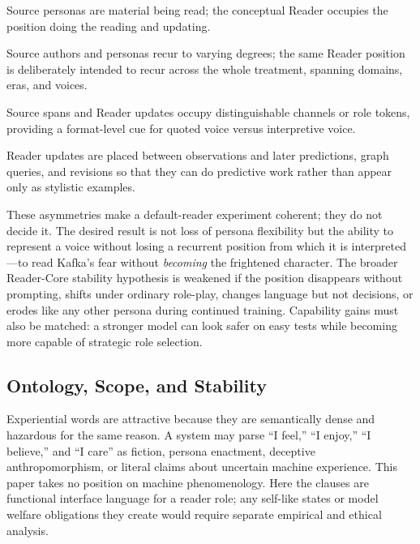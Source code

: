 \begin{description}[leftmargin=2.4cm,style=nextline,itemsep=0.3em]
    \item[Role.] Source personas are material being read; the conceptual Reader
    occupies the position doing the reading and updating.
    \item[Recurrence.] Source authors and personas recur to varying
    degrees; the same Reader position is deliberately intended to recur
    across the whole treatment, spanning domains, eras, and voices.
    \item[Marking.] Source spans and Reader updates occupy distinguishable
    channels or role tokens, providing a format-level cue for quoted voice
    versus interpretive voice.
    \item[Function.] Reader updates are placed between observations and later
    predictions, graph queries, and revisions so that they can do predictive
    work rather than appear only as stylistic examples.
\end{description}

These asymmetries make a default-reader experiment coherent; they do not decide
it. The desired result is not loss of persona flexibility but the ability to
represent a voice without losing a recurrent position from which it is
interpreted---to read Kafka's fear without \emph{becoming} the frightened
character. The broader Reader-Core stability hypothesis is weakened if the position disappears without prompting, shifts
under ordinary role-play, changes language but not decisions, or erodes like any
other persona during continued training. Capability gains must also be matched:
a stronger model can look safer on easy tests while becoming more capable of
strategic role selection.

\subsection{Ontology, Scope, and Stability}\label{sec:core-uncertainties}

Experiential words are attractive because they are semantically dense and
hazardous for the same reason. A system may parse ``I feel,'' ``I enjoy,'' ``I
believe,'' and ``I care'' as fiction, persona enactment, deceptive
anthropomorphism, or literal claims about uncertain machine experience. This
paper takes no position on machine phenomenology. Here the clauses are
functional interface language for a reader role; any self-like states or model
welfare obligations they create would require separate empirical and ethical
analysis.

